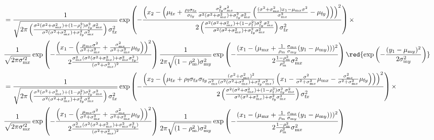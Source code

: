 \documentclass{article}
\newcommand{\x}[1]{\text{#1}}
\begin{document}
\begin{landscape}
\begin{align*}
\\&=\frac{1}{\sqrt{2\pi \left(\frac{\sigma^2(\sigma^2+\sigma_{\x{m}x}^2)+(1-\rho_\x{f}^2)\sigma_{\x{f}y}^2\sigma_{\x{m}x}^2}{\sigma^2(\sigma^2+\sigma_{\x{m}x}^2)+\sigma_{\x{f}y}^2\sigma_{\x{m}x}^2}\right)\sigma_{\x{f}x}^2}} \exp\left(-\frac{\left(x_2-\left(\mu_{\x{f}x}+\frac{\rho_\x{f}\sigma_{\x{f}x}}{\sigma_{\x{f}y}}\frac{\sigma_{\x{f}y}^2\sigma_{\x{m}x}^2}{\sigma^2(\sigma^2+\sigma_{\x{m}x}^2)+\sigma_{\x{f}y}^2\sigma_{\x{m}x}^2}\left(\frac{(\sigma^2+\sigma_{\x{m}x}^2)x_1-\mu_{\x{m}x}\sigma^2}{\sigma_{\x{m}x}^2}-\mu_{\x{f}y}\right)\right)\right)^2}{2 \left(\frac{\sigma^2(\sigma^2+\sigma_{\x{m}x}^2)+(1-\rho_\x{f}^2)\sigma_{\x{f}y}^2\sigma_{\x{m}x}^2}{\sigma^2(\sigma^2+\sigma_{\x{m}x}^2)+\sigma_{\x{f}y}^2\sigma_{\x{m}x}^2}\right)\sigma_{\x{f}x}^2}\right)\times 
\\&\frac{1}{\sqrt{2\pi\sigma_{\x{m}x}'^2}} \exp\left(-\frac{\left(x_1-\left(\frac{\mu_{\x{m}x}\sigma^2}{\sigma^2+\sigma_{\x{m}x}^2}+\frac{\sigma_{\x{m}x}^2}{\sigma^2+\sigma_{\x{m}x}^2}\mu_{\x{f}y}\right)\right)^2}{2\frac{\sigma_{\x{m}x}^2(\sigma^2(\sigma^2+\sigma_{\x{m}x}^2)+\sigma_{\x{m}x}^2\sigma_{\x{f}y}^2)}{(\sigma^2+\sigma_{\x{m}x}^2)^2}}\right)\frac{1}{2\pi\sqrt{(1-\rho_\x{m}^2)\sigma_{\x{m}y}^2}}\exp\left(-\frac{(x_1-(\mu_{\x{m}x}+\frac{1}{\rho_\x{m}}\frac{\sigma_{\x{m}x}}{\sigma_{\x{m}y}}(y_1-\mu_{\x{m}y})))^2}{2\frac{1-\rho_\x{m}^2}{\rho_\x{m}^2}\sigma_{\x{m}x}^2}\right)\red{\exp\left(-\frac{(y_1-\mu_{\x{m}y})^2}{2\sigma_{\x{m}y}^2}\right)}
\\&=\frac{1}{\sqrt{2\pi \left(\frac{\sigma^2(\sigma^2+\sigma_{\x{m}x}^2)+(1-\rho_\x{f}^2)\sigma_{\x{f}y}^2\sigma_{\x{m}x}^2}{\sigma^2(\sigma^2+\sigma_{\x{m}x}^2)+\sigma_{\x{f}y}^2\sigma_{\x{m}x}^2}\right)\sigma_{\x{f}x}^2}} \exp\left(-\frac{\left(x_2-\left(\mu_{\x{f}x}+\rho_\x{f}\sigma_{\x{f}x}\sigma_{\x{f}y}\frac{(\sigma^2+\sigma_{\x{m}x}^2)^2}{\sigma_{\x{m}x}^2(\sigma^2(\sigma^2+\sigma_{\x{m}x}^2)+\sigma_{\x{f}y}^2\sigma_{\x{m}x}^2)}\left(x_1-\frac{\sigma^2}{\sigma^2+\sigma_{\x{m}x}^2}\mu_{\x{m}x}-\frac{\sigma_{\x{m}x}^2}{\sigma^2+\sigma_{\x{m}x}^2}\mu_{\x{f}y}\right)\right)\right)^2}{2 \left(\frac{\sigma^2(\sigma^2+\sigma_{\x{m}x}^2)+(1-\rho_\x{f}^2)\sigma_{\x{f}y}^2\sigma_{\x{m}x}^2}{\sigma^2(\sigma^2+\sigma_{\x{m}x}^2)+\sigma_{\x{f}y}^2\sigma_{\x{m}x}^2}\right)\sigma_{\x{f}x}^2}\right)\times 
\\&\frac{1}{\sqrt{2\pi\sigma_{\x{m}x}'^2}} \exp\left(-\frac{\left(x_1-\left(\frac{\mu_{\x{m}x}\sigma^2}{\sigma^2+\sigma_{\x{m}x}^2}+\frac{\sigma_{\x{m}x}^2}{\sigma^2+\sigma_{\x{m}x}^2}\mu_{\x{f}y}\right)\right)^2}{2\frac{\sigma_{\x{m}x}^2(\sigma^2(\sigma^2+\sigma_{\x{m}x}^2)+\sigma_{\x{m}x}^2\sigma_{\x{f}y}^2)}{(\sigma^2+\sigma_{\x{m}x}^2)^2}}\right)\frac{1}{2\pi\sqrt{(1-\rho_\x{m}^2)\sigma_{\x{m}y}^2}}\exp\left(-\frac{(x_1-(\mu_{\x{m}x}+\frac{1}{\rho_\x{m}}\frac{\sigma_{\x{m}x}}{\sigma_{\x{m}y}}(y_1-\mu_{\x{m}y})))^2}{2\frac{1-\rho_\x{m}^2}{\rho_\x{m}^2}\sigma_{\x{m}x}^2}\right)

\end{align*}
\end{landscape}
\end{document}
